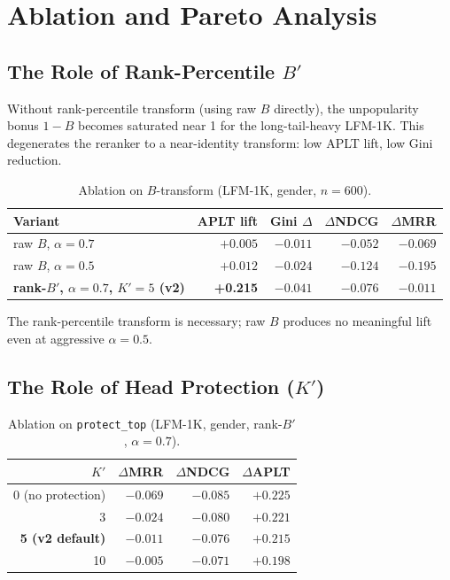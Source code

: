 \section{Ablation and Pareto Analysis}
\label{sec:ablation}

\subsection{The Role of Rank-Percentile $B'$}

Without rank-percentile transform (using raw $B$ directly), the unpopularity bonus $1 - B$ becomes saturated near 1 for the long-tail-heavy LFM-1K. This degenerates the reranker to a near-identity transform: low APLT lift, low Gini reduction.

\begin{table}[h]
\caption{Ablation on $B$-transform (LFM-1K, gender, $n=600$).}
\label{tab:ablation-b}
\begin{tabular}{lrrrr}
\toprule
Variant & APLT lift & Gini $\Delta$ & $\Delta$NDCG & $\Delta$MRR \\
\midrule
raw $B$, $\alpha=0.7$ & $+0.005$ & $-0.011$ & $-0.052$ & $-0.069$ \\
raw $B$, $\alpha=0.5$ & $+0.012$ & $-0.024$ & $-0.124$ & $-0.195$ \\
\textbf{rank-$B'$, $\alpha=0.7$, $K'=5$ (v2)} & \textbf{+0.215} & \textbf{$-0.041$} & $-0.076$ & \textbf{$-0.011$} \\
\bottomrule
\end{tabular}
\end{table}

The rank-percentile transform is necessary; raw $B$ produces no meaningful lift even at aggressive $\alpha=0.5$.

\subsection{The Role of Head Protection ($K'$)}

\begin{table}[h]
\caption{Ablation on \texttt{protect\_top} (LFM-1K, gender, rank-$B'$, $\alpha=0.7$).}
\label{tab:ablation-k}
\begin{tabular}{rrrr}
\toprule
$K'$ & $\Delta$MRR & $\Delta$NDCG & $\Delta$APLT \\
\midrule
0 (no protection) & $-0.069$ & $-0.085$ & $+0.225$ \\
3 & $-0.024$ & $-0.080$ & $+0.221$ \\
\textbf{5 (v2 default)} & \textbf{$-0.011$} & $-0.076$ & $+0.215$ \\
10 & $-0.005$ & $-0.071$ & $+0.198$ \\
\bottomrule
\end{tabular}
\end{table}


